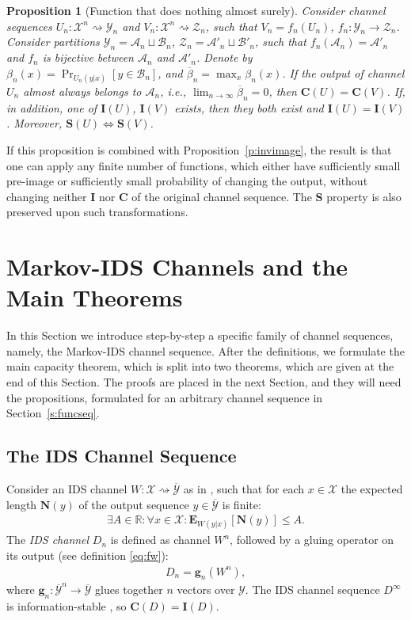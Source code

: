 \documentclass[journal, twocol]{IEEEtran}
\newcommand{\mA}{{\mathcal{A}}}
\newcommand{\mB}{{\mathcal{B}}}
\newcommand{\bfC}{{\mathbf{C}}}
\newcommand{\bfE}{{\mathbf{E}}}
\newcommand{\bfI}{{\mathbf{I}}}
\newcommand{\bfN}{{\mathbf{N}}}
\newcommand{\bR}{{\mathbb{R}}}
\newcommand{\bfS}{{\mathbf{S}}}
\newcommand{\mX}{{\mathcal{X}}}
\newcommand{\mY}{{\mathcal{Y}}}
\newcommand{\omY}{{\overline{\mathcal{Y}}}}
\newcommand{\mZ}{{\mathcal{Z}}}
\newcommand{\brsq}[1]{{\left[{#1}\right]}}
\newcommand{\tosq}{\rightsquigarrow}
\newcommand{\bg}{\mathbf{g}}
\newcommand{\obeta}{\overline{\beta}}
\newtheorem{proposition}{Proposition}
\begin{document}
\begin{proposition}[Function that does nothing almost surely]
\label{p:pr0}
Consider channel sequences $U_n:\mX^n\tosq\mY_n$ and $V_n:\mX^n\tosq\mZ_n$, such that $V_n=f_n(U_n)$, $f_n:\mY_n\to\mZ_n$.
Consider partitions $\mY_n=\mA_n \sqcup \mB_n$, $\mZ_n=\mA'_n \sqcup \mB'_n$, such that $f_n(\mA_n)=\mA'_n$ and $f_n$ is bijective between $\mA_n$ and $\mA'_n$.
Denote by $\beta_n(x)=\Pr_{U_n(y|x)}\brsq{y\in\mB_n}$, and $\obeta_n=\max_x\beta_n(x)$.
If the output of channel $U_n$ almost always belongs to $\mA_n$, i.e., $\lim_{n\to\infty}\obeta_n=0$, then $\bfC(U)=\bfC(V)$.
If, in addition, one of $\bfI(U)$, $\bfI(V)$ exists, then they both exist and $\bfI(U)=\bfI(V)$.
Moreover, $\bfS(U)\iff\bfS(V)$.
\end{proposition}

If this proposition is combined with Proposition~\ref{p:invimage}, the result is that one can apply any finite number of functions, which either have sufficiently small pre-image or sufficiently small probability of changing the output, without changing neither $\bfI$ nor $\bfC$ of the original channel sequence.
The $\bfS$ property is also preserved upon such transformations.

\section{Markov-IDS Channels and the Main Theorems}
\label{s:mark}

In this Section we introduce step-by-step a specific family of channel sequences, namely, the Markov-IDS channel sequence. 
After the definitions, we formulate the main capacity theorem, which is split into two theorems, which are given at the end of this Section. 
The proofs are placed in the next Section, and they will need the propositions, formulated for an arbitrary channel sequence in Section~\ref{s:funcseq}.

\subsection{The IDS Channel Sequence}

Consider an IDS channel $W:\mX\tosq\omY$ as in \cite{dobrushin67shannons}, such that for each $x\in \mX$ the expected length $\bfN(y)$ of the output sequence $y\in\omY$ is finite:
\begin{align}
\exists A\in\bR: \forall x \in \mX: \bfE_{W(y|x)}\brsq{\bfN(y)}\leq A.
\label{eq:eN}
\end{align}
The \emph{IDS channel} $D_n$ is defined as channel $W^n$, followed by a gluing operator on its output (see definition \eqref{eq:fw}):
\begin{align}
D_n=\bg_n(W^n),
\label{eq:wids}
\end{align}
where $\bg_n:\omY^n\to\omY$ glues together $n$ vectors over $\mY$.
The IDS channel sequence $D^\infty$ is information-stable \cite{dobrushin67shannons}, so $\bfC(D)=\bfI(D)$.
\end{document}
